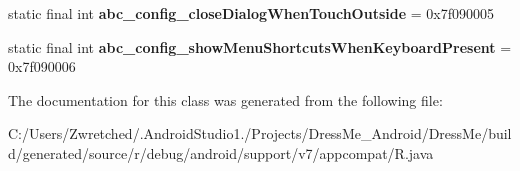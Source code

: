 \begin{DoxyCompactItemize}
\item 
\hypertarget{classandroid_1_1support_1_1v7_1_1appcompat_1_1_r_1_1bool_a688db2f19b7f1b88da592373c9cac8e1}{}static final int {\bfseries abc\+\_\+config\+\_\+close\+Dialog\+When\+Touch\+Outside} = 0x7f090005\label{classandroid_1_1support_1_1v7_1_1appcompat_1_1_r_1_1bool_a688db2f19b7f1b88da592373c9cac8e1}

\item 
\hypertarget{classandroid_1_1support_1_1v7_1_1appcompat_1_1_r_1_1bool_a3ab19dbca326c1a267728200308d7a3d}{}static final int {\bfseries abc\+\_\+config\+\_\+show\+Menu\+Shortcuts\+When\+Keyboard\+Present} = 0x7f090006\label{classandroid_1_1support_1_1v7_1_1appcompat_1_1_r_1_1bool_a3ab19dbca326c1a267728200308d7a3d}

\end{DoxyCompactItemize}


The documentation for this class was generated from the following file\+:\begin{DoxyCompactItemize}
\item 
C\+:/\+Users/\+Zwretched/.\+Android\+Studio1./\+Projects/\+Dress\+Me\+\_\+\+Android/\+Dress\+Me/build/generated/source/r/debug/android/support/v7/appcompat/R.\+java\end{DoxyCompactItemize}
